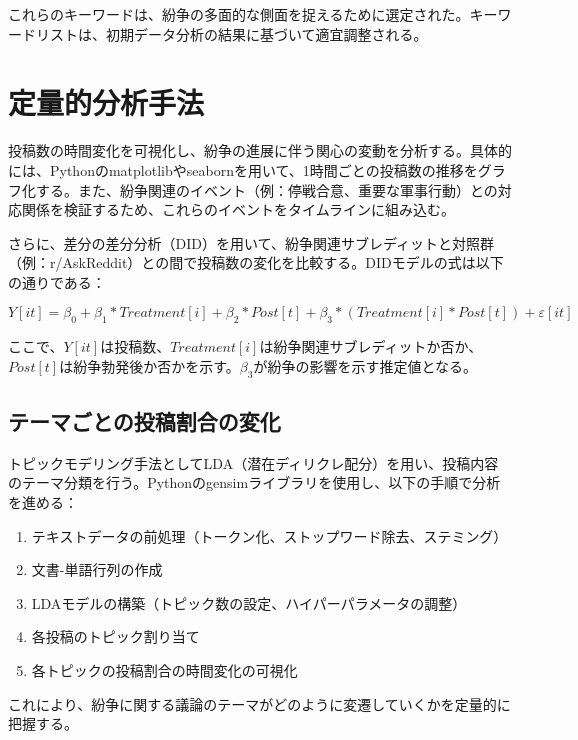 \documentclass[11pt, a4j]{jreport}
\begin{document}
    これらのキーワードは、紛争の多面的な側面を捉えるために選定された。キーワードリストは、初期データ分析の結果に基づいて適宜調整される。

    \section{定量的分析手法}
    投稿数の時間変化を可視化し、紛争の進展に伴う関心の変動を分析する。具体的には、Pythonのmatplotlibやseabornを用いて、1時間ごとの投稿数の推移をグラフ化する。また、紛争関連のイベント（例：停戦合意、重要な軍事行動）との対応関係を検証するため、これらのイベントをタイムラインに組み込む。

    さらに、差分の差分分析（DID）を用いて、紛争関連サブレディットと対照群（例：r/AskReddit）との間で投稿数の変化を比較する。DIDモデルの式は以下の通りである：

    \begin{equation}
        Y[it] = β_{0}+ β_{1}* Treatment[i] + β_{2}* Post[t] + β_{3}* (Treatme nt[
        i] * Post[t]) + ε[it]
    \end{equation}

    ここで、$Y[it]$は投稿数、$Treatment[i]$は紛争関連サブレディットか否か、$Post[
    t]$は紛争勃発後か否かを示す。$β_{3}$が紛争の影響を示す推定値となる。

    \subsection{テーマごとの投稿割合の変化}
    トピックモデリング手法としてLDA（潜在ディリクレ配分）を用い、投稿内容のテーマ分類を行う。Pythonのgensimライブラリを使用し、以下の手順で分析を進める：

    \begin{enumerate}
        \item テキストデータの前処理（トークン化、ストップワード除去、ステミング）

        \item 文書-単語行列の作成

        \item LDAモデルの構築（トピック数の設定、ハイパーパラメータの調整）

        \item 各投稿のトピック割り当て

        \item 各トピックの投稿割合の時間変化の可視化
    \end{enumerate}

    これにより、紛争に関する議論のテーマがどのように変遷していくかを定量的に把握する。
\end{document}
